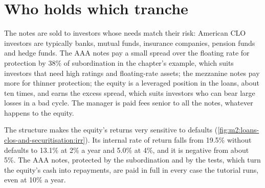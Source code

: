 \section{Who holds which tranche}

The notes are sold to investors whose needs match their risk: American CLO investors
are typically banks, mutual funds, insurance companies, pension funds and hedge funds.
The AAA notes pay a small spread over the floating rate for protection by 38\% of
subordination in the chapter's example, which suits investors that need high ratings
and floating-rate assets; the mezzanine notes pay more for thinner protection; the
equity is a leveraged position in the loans, about ten times, and earns the excess
spread, which suits investors who can bear large losses in a bad cycle. The manager is
paid fees senior to all the notes, whatever happens to the equity.

The structure makes the equity's returns very sensitive to defaults
(\cref{fig:m2:loans-clos-and-securitisation:irr}). Its internal rate of return falls
from 19.5\% without defaults to 13.1\% at 2\% a year and 5.0\% at 4\%, and it is
negative from about 5\%. The AAA notes, protected by the subordination and by the
tests, which turn the equity's cash into repayments, are paid in full in every case
the tutorial runs, even at 10\% a year.

\begin{omfigure}

\label{fig:m2:loans-clos-and-securitisation:irr}
\end{omfigure}

